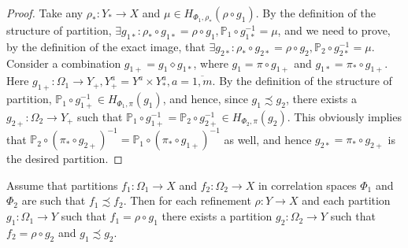 \begin{proof}
	Take any $\rho_* : Y_* \rightarrow X$ and $\mu \in H_{\Phi_1,\rho_*}(\rho \circ g_1)$. By the definition of the structure of partition, $\exists g_{1*}: \rho_* \circ g_{1*} = \rho \circ g_1, \mathbb{P}_1 \circ g_{1*}^{-1} = \mu$, and we need to prove, by the definition of the exact image, that $\exists g_{2*}: \rho_* \circ g_{2*} = \rho \circ g_2, \mathbb{P}_2 \circ g_{2*}^{-1} = \mu$. Consider a combination $g_{1+} = g_1 \diamond g_{1*}$, where $g_1 = \pi \circ g_{1+}$ and $g_{1*} = \pi_* \circ g_{1+}$. Here $g_{1+} : \Omega_1 \rightarrow Y_+, Y_+^a = Y^a \times Y_*^a, a=\overline{1,m}$. By the definition of the structure of partition, $\mathbb{P}_1 \circ g_{1+}^{-1} \in H_{\Phi_1,\pi}(g_1)$, and hence, since $g_1 \precsim g_2$, there exists a $g_{2+} : \Omega_2 \rightarrow Y_+$ such that $\mathbb{P}_1 \circ g_{1+}^{-1} = \mathbb{P}_2 \circ g_{2+}^{-1} \in H_{\Phi_2,\pi}(g_2)$. This obviously implies that $\mathbb{P}_2 \circ (\pi_* \circ g_{2+})^{-1} = \mathbb{P}_1 \circ (\pi_* \circ g_{1+})^{-1}$ as well, and hence $g_{2*} = \pi_* \circ g_{2+}$ is the desired partition. %
\end{proof}

\begin{lemma} \label{lemma:down}
	Assume that partitions $f_1 : \Omega_1 \rightarrow X$ and $f_2 : \Omega_2 \rightarrow X$ in correlation spaces $\Phi_1$ and $\Phi_2$ are such that $f_1 \precsim f_2$. Then for each refinement $\rho : Y \rightarrow X$ and each partition $g_1 : \Omega_1 \rightarrow Y$ such that $f_1 = \rho \circ g_1$ there exists a partition $g_2 : \Omega_2 \rightarrow Y$ such that $f_2 = \rho \circ g_2$ and $g_1 \precsim g_2$. %
\end{lemma}

